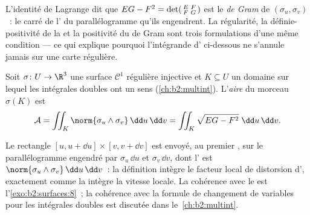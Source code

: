 \begin{remark}
L'identité de Lagrange dit que $EG - F^2 = \det\begin{psmallmatrix}
E & F\\ F & G\end{psmallmatrix}$ est le \emph{ de
Gram} de $(\sigma_u, \sigma_v)$~: le carré de l' du
parallélogramme qu'ils engendrent. La régularité, la
définie-positivité de la  et la
positivité du  de Gram sont trois formulations d'une
même condition --- ce qui explique pourquoi l'intégrande d'
ci-dessous ne s'annule jamais sur une carte régulière.
\end{remark}

\begin{definition}[Aire]\label{def:b2:surfaces:area}
Soit $\sigma \colon U \to \R^3$ une surface $\mathcal{C}^1$
régulière injective et $K \subseteq U$ un domaine  sur
lequel les intégrales doubles ont un sens (\cref{ch:b2:multint}). L'\emph{aire} du morceau $\sigma(K)$ est
\[
\mathcal{A}
= \iint_K \norm{\sigma_u \wedge \sigma_v}\,\dd u\,\dd v
= \iint_K \sqrt{EG - F^2}\;\dd u\,\dd v .
\]
\end{definition}

\begin{remark}
Le rectangle $[u, u + \dd u] \times [v, v + \dd v]$ est envoyé, au
premier , sur le parallélogramme engendré par $\sigma_u\,\dd u$
et $\sigma_v\,\dd v$, dont l' est $\norm{\sigma_u \wedge
\sigma_v}\,\dd u\,\dd v$~: la définition intègre le facteur local de
distorsion d', exactement comme la  intègre la
vitesse locale. La cohérence avec le  est
l'\cref{exo:b2:surfaces:8}~; la cohérence avec la formule de
changement de variables pour les intégrales doubles est discutée
dans le~\cref{ch:b2:multint}.
\end{remark}

